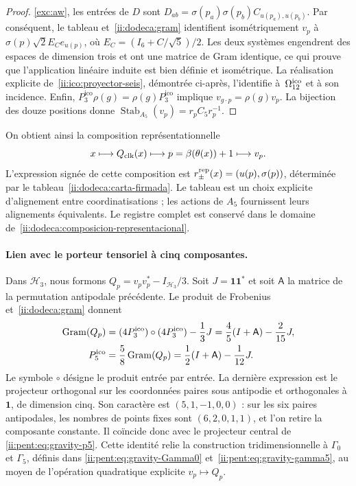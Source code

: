 \begin{proof}
\begin{sloppypar}
\eqref{exc:aw}, les entrées de \(D\) sont
\(D_{ab}=\sigma(p_a)\sigma(p_b)C_{u(p_a),u(p_b)}\).
Par conséquent, le tableau et~\eqref{ii:dodeca:gram} identifient
isométriquement \(v_p\) à
\(\sigma(p)\sqrt2 E_Ce_{u(p)}\), où
\(E_C=(I_6+C/\sqrt5)/2\). Les deux systèmes engendrent des espaces de dimension
trois et ont une matrice de Gram identique, ce qui prouve que l’application
linéaire induite est bien définie et isométrique. La réalisation
explicite de~\eqref{ii:ico:proyector-seis}, démontrée ci-après,
l’identifie à~\(\Omega_{12}^{\rm ico}\) et à son incidence.
Enfin, \(P_3^{\mathrm{ico}}\rho(g)=\rho(g)P_3^{\mathrm{ico}}\) implique
\(v_{g\cdot p}=\rho(g)v_p\). La bijection des douze positions donne
\(\operatorname{Stab}_{A_5}(v_p)=r_pC_5r_p^{-1}\).
\end{sloppypar}
\end{proof}

On obtient ainsi la composition représentationnelle
\begin{equation}
 x\longmapsto Q_{\rm clk}(x)\longmapsto
 p=\beta(\theta(x))+1\longmapsto v_p.
 \label{ii:dodeca:composicion-representacional}
\end{equation}
L’expression signée de cette composition est
\(r_\pm^{\rm rep}(x)=(u(p),\sigma(p))\), déterminée par le
tableau~\eqref{ii:dodeca:carta-firmada}. Le tableau est un choix explicite
d’alignement entre coordinatisations ; les actions de \(A_5\) fournissent leurs
alignements équivalents. Le registre complet est conservé dans le
domaine de~\eqref{ii:dodeca:composicion-representacional}.

\paragraph{Lien avec le porteur tensoriel à cinq composantes.}
Dans \(\mathcal H_3\), nous formons
\(Q_p=v_pv_p^*-I_{\mathcal H_3}/3\). Soit \(J=\mathbf1\mathbf1^*\)
et soit \(\mathsf A\) la matrice de la permutation antipodale précédente.
Le produit de Frobenius et~\eqref{ii:dodeca:gram} donnent
\begin{equation}
 \begin{aligned}
 \operatorname{Gram}(Q_p)
 &=(4P_3^{\mathrm{ico}})\circ(4P_3^{\mathrm{ico}})-\frac13J
 =\frac45(I+\mathsf A)-\frac2{15}J,
 \\
 P^{\rm ico}_5&=\frac58\operatorname{Gram}(Q_p)
 =\frac12(I+\mathsf A)-\frac1{12}J.
 \end{aligned}
 \label{ii:dodeca:puente-tensorial}
\end{equation}
Le symbole \(\circ\) désigne le produit entrée par entrée. La dernière
expression est le projecteur orthogonal sur les coordonnées paires sous
antipodie et orthogonales à \(\mathbf1\), de dimension cinq. Son caractère
est \((5,1,-1,0,0)\) : sur les six paires antipodales, les nombres de
points fixes sont \((6,2,0,1,1)\), et l’on retire la composante constante.
Il coïncide donc avec le projecteur central de
\eqref{ii:pent:eq:gravity-p5}. Cette identité relie la construction
tridimensionnelle à \(\Gamma_0\) et \(\Gamma_5\), définis dans
\eqref{ii:pent:eq:gravity-Gamma0} et~\eqref{ii:pent:eq:gravity-gamma5},
au moyen de l’opération quadratique explicite \(v_p\mapsto Q_p\).

